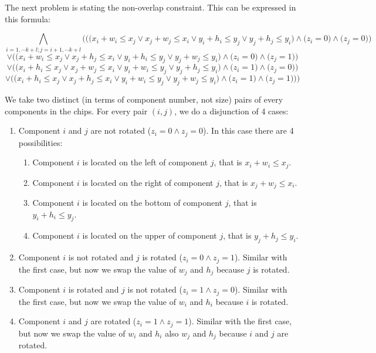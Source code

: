 \documentclass[12pt]{article}
\begin{document}
The next problem is stating the non-overlap constraint. This can be expressed in this formula:

\[ \bigwedge_{i=1,\cdots k+l; j=i+1,\cdots k+l}{\Bigg(\bigg(\Big(x_i+w_i \leq x_j \vee x_j+w_j \leq x_i \vee y_i+h_i \leq y_j \vee y_j+h_j \leq y_i \Big)  \wedge \Big(z_i=0\Big) \wedge \Big(z_j=0\Big)\bigg) }\]
\[{\vee \bigg(\Big(x_i+w_i \leq x_j \vee x_j+h_j \leq x_i \vee y_i+h_i \leq y_j \vee y_j+w_j \leq y_i \Big)  \wedge \Big(z_i=0\Big) \wedge \Big(z_j=1\Big)\bigg) }\]
\[{\vee \bigg(\Big(x_i+h_i \leq x_j \vee x_j+w_j \leq x_i \vee y_i+w_i \leq y_j \vee y_j+h_j \leq y_i \Big)  \wedge \Big(z_i=1\Big) \wedge \Big(z_j=0\Big)\bigg)}\]
\[{ \vee \bigg(\Big(x_i+h_i \leq x_j \vee x_j+h_j \leq x_i \vee y_i+w_i \leq y_j \vee y_j+w_j \leq y_i \Big)  \wedge \Big(z_i=1\Big) \wedge \Big(z_j=1\Big)\bigg) \Bigg)}\]

We take two distinct (in terms of component number, not size) pairs of every components in the chips. For every pair $(i,j)$, we do a disjunction of 4 cases: 
\begin{enumerate}
	\item Component $i$ and $j$ are not rotated ($z_i=0 \wedge z_j=0$). In this case there are 4 possibilities: 
	\begin{enumerate}
		\item Component $i$ is located on the left of component $j$, that is $x_i+w_i \leq x_j$.
		 \item Component $i$ is located on the right of component $j$, that is $x_j+w_j \leq x_i$.
		 \item Component $i$ is located on the bottom of component $j$, that is $y_i+h_i \leq y_j$.
		 \item Component $i$ is located on the upper of component $j$, that is $y_j+h_j \leq y_i$.
	\end{enumerate}
	\item Component $i$ is not rotated and $j$ is rotated ($z_i=0 \wedge z_j=1$). Similar with the first case, but now we swap the value of $w_j$ and $h_j$ because $j$ is rotated.
	\item Component $i$ is rotated and $j$ is not rotated ($z_i=1 \wedge z_j=0$). Similar with the first case, but now we swap the value of $w_i$ and $h_i$ because $i$ is rotated.
	\item Component $i$ and $j$ are rotated ($z_i=1 \wedge z_j=1$). Similar with the first case, but now we swap the value of $w_i$ and $h_i$ also $w_j$ and $h_j$ because $i$ and $j$ are rotated.
\end{enumerate}
\end{document}
